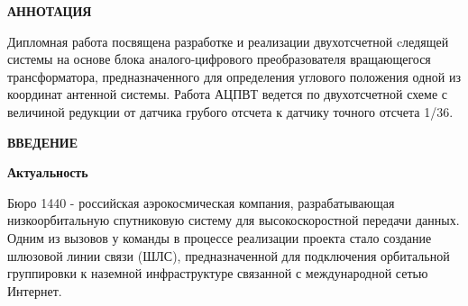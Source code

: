 \newpage
\begin{center}
  \textbf{\large АННОТАЦИЯ}
\end{center}





Дипломная работа посвящена разработке и реализации двухотсчетной cледящей системы на основе блока аналого-цифрового преобразователя вращающегося трансформатора, 
предназначенного для определения углового положения одной из координат антенной системы. Работа АЦПВТ ведется по двухотсчетной схеме с величиной редукции от датчика грубого отсчета к датчику точного отсчета 1/36.


\onehalfspacing
\setcounter{page}{2}

\newpage
\renewcommand{\contentsname}{\centerline{\large СОДЕРЖАНИЕ}}
\tableofcontents

\newpage
\begin{center}
  \textbf{\large ВВЕДЕНИЕ}
\end{center}


\textbf{Актуальность} 

Бюро 1440 - российская аэрокосмическая компания, разрабатывающая низкоорбитальную спутниковую систему для высокоскоростной передачи данных. 
Одним из вызовов у команды в процессе реализации проекта стало создание шлюзовой линии связи (ШЛС), 
предназначенной для подключения орбитальной группировки к наземной инфраструктуре связанной с международной сетью Интернет.

